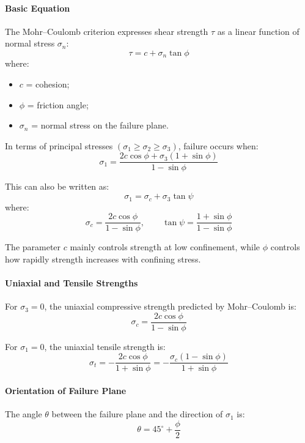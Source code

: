 \paragraph{Basic Equation}

The Mohr--Coulomb criterion expresses shear strength \(\tau\) as a linear function of
normal stress \(\sigma_n\):
\[
\tau = c + \sigma_n \tan\phi
\]
where:
\begin{itemize}
 \item \(c\) = cohesion;
 \item \(\phi\) = friction angle;
 \item \(\sigma_n\) = normal stress on the failure plane.
\end{itemize}

In terms of principal stresses \((\sigma_1 \geq \sigma_2 \geq \sigma_3)\), failure occurs when:
\[
\sigma_1 =
\frac{2c\cos\phi + \sigma_3(1+\sin\phi)}
{1-\sin\phi}
\]

This can also be written as:
\[
\sigma_1 = \sigma_c + \sigma_3 \tan\psi
\]
where:
\[
\sigma_c =
\frac{2c\cos\phi}{1-\sin\phi},
\qquad
\tan\psi =
\frac{1+\sin\phi}{1-\sin\phi}
\]

\begin{calcbox}
The parameter \(c\) mainly controls strength at low confinement, while \(\phi\) controls
how rapidly strength increases with confining stress.
\end{calcbox}

\paragraph{Uniaxial and Tensile Strengths}

For \(\sigma_3 = 0\), the uniaxial compressive strength predicted by Mohr--Coulomb is:
\[
\sigma_c =
\frac{2c\cos\phi}{1-\sin\phi}
\]

For \(\sigma_1 = 0\), the uniaxial tensile strength is:
\[
\sigma_t =
-\frac{2c\cos\phi}{1+\sin\phi}
=
-\frac{\sigma_c(1-\sin\phi)}{1+\sin\phi}
\]

\paragraph{Orientation of Failure Plane}

The angle \(\theta\) between the failure plane and the direction of \(\sigma_1\) is:
\[
\theta = 45^\circ + \frac{\phi}{2}
\]

